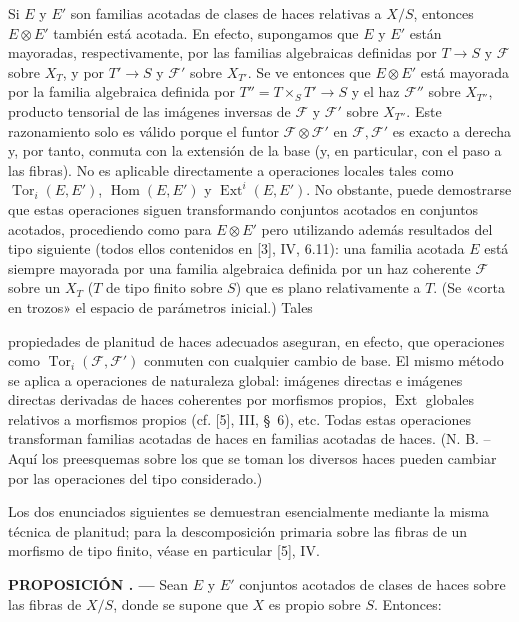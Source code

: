 \documentclass[11pt,twoside,openany]{book}
\numberwithin{equation}{section}
\newcommand{\src}[1]{%
  \phantomsection\hypertarget{src:#1}{}%
  \marginpar{\raggedleft\footnotesize\sffamily #1}%
}
\theoremstyle{plain}
\theoremstyle{definition}
\theoremstyle{remark}
\newcommand{\result}[2]{%
  \par\medskip\noindent\textbf{#1%
  \if\relax\detokenize{#2}\relax\else\space#2\fi. ---}\enspace
}
\newcommand{\FgaUnitKey}{frontmatter}
\renewcommand{\src}[1]{%
  \phantomsection\hypertarget{src:\FgaUnitKey:#1}{}%
  \marginpar{\raggedleft\footnotesize\sffamily #1}%
}
\theoremstyle{plain}
\theoremstyle{definition}
\theoremstyle{remark}
\begin{document}
Si $E$ y $E'$ son familias acotadas de clases de haces relativas a $X/S$,
entonces $E\otimes E'$ también está acotada. En efecto, supongamos que $E$ y
$E'$ están mayoradas, respectivamente, por las familias algebraicas definidas
por $T\longrightarrow S$ y $\mathcal F$ sobre $X_T$, y por
$T'\longrightarrow S$ y $\mathcal F'$ sobre $X_{T'}$. Se ve entonces que
$E\otimes E'$ está mayorada por la familia algebraica definida por
$T''=T\times_S T'\longrightarrow S$ y el haz $\mathcal F''$ sobre
$X_{T''}$, producto tensorial de las imágenes inversas de $\mathcal F$ y
$\mathcal F'$ sobre $X_{T''}$. Este razonamiento solo es válido porque el
funtor $\mathcal F\otimes\mathcal F'$ en $\mathcal F,\mathcal F'$ es exacto a
derecha y, por tanto, conmuta con la extensión de la base (y, en particular,
con el paso a las fibras). No es aplicable directamente a operaciones locales
tales como $\operatorname{Tor}_i(E,E')$, $\operatorname{Hom}(E,E')$ y
$\operatorname{Ext}^i(E,E')$. No obstante, puede demostrarse que estas
operaciones siguen transformando conjuntos acotados en conjuntos acotados,
procediendo como para $E\otimes E'$ pero utilizando además resultados del tipo
siguiente (todos ellos contenidos en [3], IV, 6.11): una familia acotada $E$
está siempre mayorada por una familia algebraica definida por un haz coherente
$\mathcal F$ sobre un $X_T$ ($T$ de tipo finito sobre $S$) que es plano
relativamente a $T$. (Se «corta en trozos» el espacio de parámetros inicial.)
Tales
\src{252}
propiedades de planitud de haces adecuados aseguran, en efecto, que operaciones
como $\operatorname{Tor}_i(\mathcal F,\mathcal F')$ conmuten con cualquier
cambio de base. El mismo método se aplica a operaciones de naturaleza global:
imágenes directas e imágenes directas derivadas de haces coherentes por
morfismos propios, $\operatorname{Ext}$ globales relativos a morfismos propios
(cf. [5], III, \S~6), etc. Todas estas operaciones transforman familias
acotadas de haces en familias acotadas de haces. (N. B. -- Aquí los
preesquemas sobre los que se toman los diversos haces pueden cambiar por las
operaciones del tipo considerado.)

Los dos enunciados siguientes se demuestran esencialmente mediante la misma
técnica de planitud; para la descomposición primaria sobre las fibras de un
morfismo de tipo finito, véase en particular [5], IV.

\result{PROPOSICIÓN}{1.2} Sean $E$ y $E'$ conjuntos acotados de clases de
haces sobre las fibras de $X/S$, donde se supone que $X$ es propio sobre $S$.
Entonces:
\end{document}
